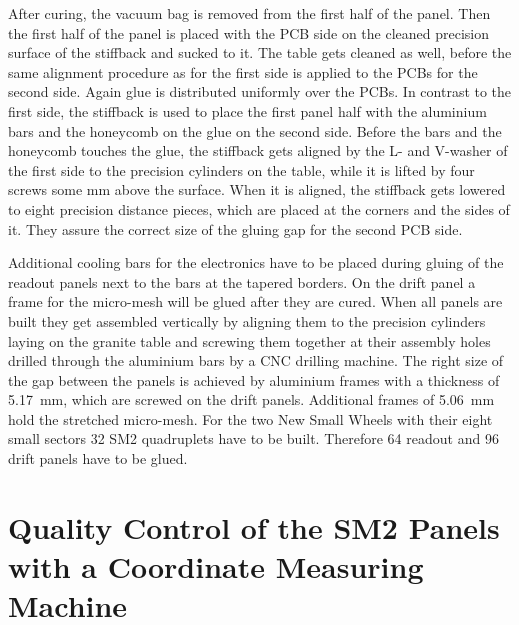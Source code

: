 \documentclass[
a4paper,                                %
twoside,                                %
BCOR1.4cm,                      %
10pt,                           %
headings=normal,                %
headsepline,                    %
clearplainpage, %
final,                                  %
div=14,
parskip=full,
openright,
bibliography=toc
]{scrreprt}
\begin{document}
After curing, the vacuum bag is removed from the first half of the panel. Then the first half of the panel is placed with the PCB side on the cleaned precision surface of the stiffback and sucked to it. The table gets cleaned as well, before the same alignment procedure as for the first side is applied to the PCBs for the second side. Again glue is distributed uniformly over the PCBs. In contrast to the first side, the stiffback is used to place the first panel half with the aluminium bars and the honeycomb on the glue on the second side. Before the bars and the honeycomb touches the glue, the stiffback gets aligned by the L- and V-washer of the first side to the precision cylinders on the table, while it is lifted by four screws some mm above the surface. When it is aligned, the stiffback gets lowered to eight precision distance pieces, which are placed at the corners and the sides of it. They assure the correct size of the gluing gap for the second PCB side.

Additional cooling bars for the electronics have to be placed during gluing of the readout panels next to the bars at the tapered borders. On the drift panel a frame for the micro-mesh will be glued after they are cured. When all panels are built they get assembled vertically by aligning them to the precision cylinders laying on the granite table and screwing them together at their assembly holes drilled through the aluminium bars by a CNC drilling machine. The right size of the gap between the panels is achieved by aluminium frames with a thickness of \SI{5.17}{mm}, which are screwed on the drift panels. Additional frames of \SI{5.06}{mm} hold the stretched micro-mesh. For the two New Small Wheels with their eight small sectors 32 SM2 quadruplets have to be built. Therefore 64 readout and 96 drift panels have to be glued.

\chapter{Quality Control of the SM2 Panels with a Coordinate Measuring Machine}
\end{document}
